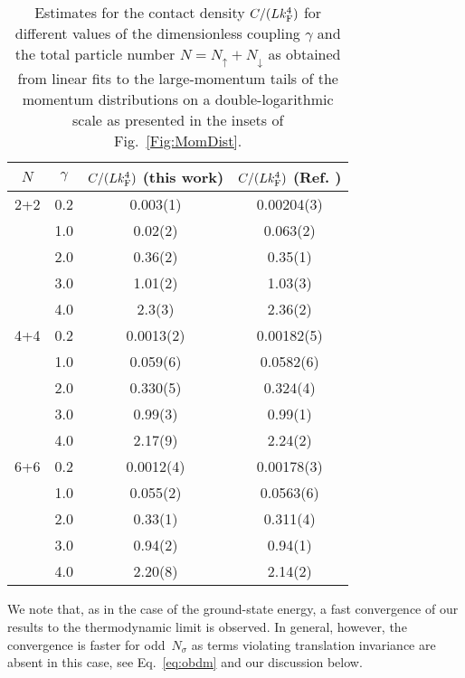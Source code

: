 \documentclass[pra,aps,groupedaddress,floatfix,twocolumn,superscriptaddress,showpacs,nofootinbib]{revtex4-1}
\newcommand{\kf}{k_\textnormal{F}}
\begin{document}
{\begin{table}[t]
\begin{tabularx}{\columnwidth}{@{\extracolsep{\fill}} c c | c c  }
\hline \hline
$N$	& $\gamma$	& $C/(L k_{\textnormal{F}}^{4}) $ (this work)	& $C/(L k_{\textnormal{F}}^{4})$ (Ref. \cite{GCS1D})	\\
\hline
2+2	& 0.2	& 0.003(1)	& 0.00204(3)	\\
	& 1.0	& 0.02(2)	& 0.063(2)	\\
	& 2.0	& 0.36(2)	& 0.35(1)	\\
	& 3.0	& 1.01(2)	& 1.03(3)	\\
	& 4.0	& 2.3(3)	& 2.36(2)	\\
\hline
4+4	& 0.2	& 0.0013(2)	& 0.00182(5)	\\
	& 1.0	& 0.059(6)	& 0.0582(6)	\\
	& 2.0	& 0.330(5)	& 0.324(4)	\\
	& 3.0	& 0.99(3)	& 0.99(1)	\\
	& 4.0	& 2.17(9)	& 2.24(2)	\\
\hline
6+6	& 0.2	& 0.0012(4)	& 0.00178(3)	\\
	& 1.0	& 0.055(2)	& 0.0563(6)	\\
	& 2.0	& 0.33(1)	& 0.311(4)	\\
	& 3.0	& 0.94(2)	& 0.94(1)	\\
	& 4.0	& 2.20(8)	& 2.14(2)	\\
\hline  \hline
\end{tabularx}
\caption{\label{Table:Contact}
{Estimates for the contact density $C/(L\kf^{4})$ for different values of the dimensionless
coupling $\gamma$ and the total particle number $N=N_{\uparrow}+N_{\downarrow}$ as obtained from linear fits
to the large-momentum tails of the momentum distributions on a double-logarithmic scale as
presented in the insets of Fig.~\ref{Fig:MomDist}.}
}
\end{table}
%

We note that, as in the case of the ground-state energy, a fast convergence of our results
to the thermodynamic limit is observed. In general,
however, the convergence is faster for odd~$N_{\sigma}$ as terms violating translation invariance
are absent in this case, see Eq.~\eqref{eq:obdm} and our discussion below.}
\end{document}
